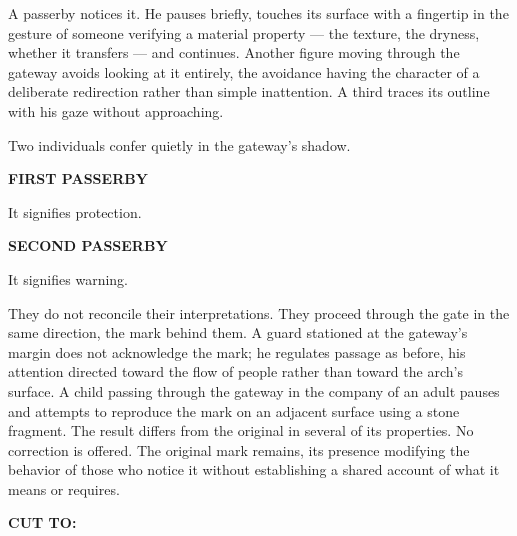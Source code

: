 \documentclass[12pt, oneside]{article}
\newcommand{\sceneheading}[1]{%
  \vspace{1.8em}%
  \noindent{\bfseries\large\MakeUppercase{#1}}%
  \vspace{0.6em}%
  \par\noindent{\color{rulecolor}\rule{\linewidth}{0.3pt}}%
  \vspace{0.5em}\par%
}
\newenvironment{action}{%
  \vspace{0.6em}%
  \noindent\ignorespaces%
}{%
  \par\vspace{0.6em}%
}
\newcommand{\character}[1]{%
  \vspace{0.8em}%
  \begin{center}%
    \bfseries\MakeUppercase{#1}%
  \end{center}%
  \vspace{-0.3em}%
}
\newenvironment{dialogue}{%
  \vspace{0.2em}%
  \begin{list}{}{%
    \setlength{\leftmargin}{1.2in}%
    \setlength{\rightmargin}{0.8in}%
    \setlength{\itemsep}{0.6em}%
    \setlength{\parsep}{0pt}%
  }%
}{%
  \end{list}%
  \vspace{0.4em}%
}
\newcommand{\says}[2]{%
  \character{#1}%
  \begin{dialogue}\item #2\end{dialogue}%
}
\newcommand{\transition}[1]{%
  \vspace{0.8em}%
  \begin{flushright}%
    \bfseries #1%
  \end{flushright}%
  \vspace{0.5em}%
}
\begin{document}
\begin{action}
A passerby notices it. He pauses briefly, touches its surface with a fingertip in the gesture of someone verifying a material property --- the texture, the dryness, whether it transfers --- and continues. Another figure moving through the gateway avoids looking at it entirely, the avoidance having the character of a deliberate redirection rather than simple inattention. A third traces its outline with his gaze without approaching.

Two individuals confer quietly in the gateway's shadow.
\end{action}

\says{First Passerby}{It signifies protection.}

\says{Second Passerby}{It signifies warning.}

\begin{action}
They do not reconcile their interpretations. They proceed through the gate in the same direction, the mark behind them. A guard stationed at the gateway's margin does not acknowledge the mark; he regulates passage as before, his attention directed toward the flow of people rather than toward the arch's surface. A child passing through the gateway in the company of an adult pauses and attempts to reproduce the mark on an adjacent surface using a stone fragment. The result differs from the original in several of its properties. No correction is offered. The original mark remains, its presence modifying the behavior of those who notice it without establishing a shared account of what it means or requires.
\end{action}

\transition{CUT TO:}

\sceneheading{INT. Negotiation Chamber — Day}
\end{document}
